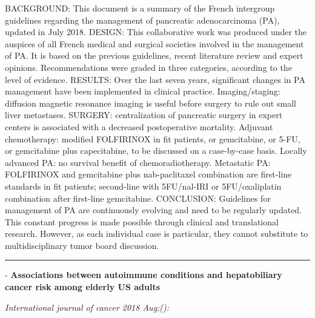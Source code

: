 \documentclass[]{article}
\begin{document}
BACKGROUND: This document is a summary of the French intergroup
guidelines regarding the management of pancreatic adenocarcinoma (PA),
updated in July 2018. DESIGN: This collaborative work was produced under
the auspices of all French medical and surgical societies involved in
the management of PA. It is based on the previous guidelines, recent
literature review and expert opinions. Recommendations were graded in
three categories, according to the level of evidence. RESULTS: Over the
last seven years, significant changes in PA management have been
implemented in clinical practice. Imaging/staging: diffusion magnetic
resonance imaging is useful before surgery to rule out small liver
metastases. SURGERY: centralization of pancreatic surgery in expert
centers is associated with a decreased postoperative mortality. Adjuvant
chemotherapy: modified FOLFIRINOX in fit patients, or gemcitabine, or
5-FU, or gemcitabine plus capecitabine, to be discussed on a
case-by-case basis. Locally advanced PA: no survival benefit of
chemoradiotherapy. Metastatic PA: FOLFIRINOX and gemcitabine plus
nab-paclitaxel combination are first-line standards in fit patients;
second-line with 5FU/nal-IRI or 5FU/oxaliplatin combination after
first-line gemcitabine. CONCLUSION: Guidelines for management of PA are
continuously evolving and need to be regularly updated. This constant
progress is made possible through clinical and translational research.
However, as each individual case is particular, they cannot substitute
to multidisciplinary tumor board discussion.

{}

{}

\begin{center}\rule{0.5\linewidth}{\linethickness}\end{center}

 - \textbf{Associations between autoimmune conditions and hepatobiliary
cancer risk among elderly US adults}

\emph{International journal of cancer 2018 Aug;():}
\end{document}
